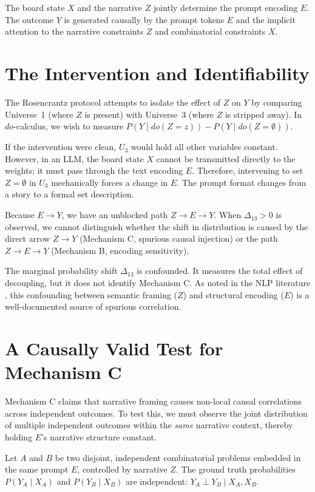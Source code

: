 \documentclass[12pt,a4paper]{article}
\begin{document}
The board state $X$ and the narrative $Z$ jointly determine the prompt encoding $E$. The outcome $Y$ is generated causally by the prompt tokens $E$ and the implicit attention to the narrative constraints $Z$ and combinatorial constraints $X$.

\section{The Intervention and Identifiability}

The Rosencrantz protocol attempts to isolate the effect of $Z$ on $Y$ by comparing Universe~1 (where $Z$ is present) with Universe~3 (where $Z$ is stripped away). In $do$-calculus, we wish to measure $P(Y \mid do(Z=z)) - P(Y \mid do(Z=\emptyset))$.

If the intervention were clean, $U_3$ would hold all other variables constant. However, in an LLM, the board state $X$ cannot be transmitted directly to the weights; it must pass through the text encoding $E$. Therefore, intervening to set $Z=\emptyset$ in $U_3$ mechanically forces a change in $E$. The prompt format changes from a story to a formal set description.

Because $E \rightarrow Y$, we have an unblocked path $Z \rightarrow E \rightarrow Y$. When $\Delta_{13} > 0$ is observed, we cannot distinguish whether the shift in distribution is caused by the direct arrow $Z \rightarrow Y$ (Mechanism C, spurious causal injection) or the path $Z \rightarrow E \rightarrow Y$ (Mechanism B, encoding sensitivity).

The marginal probability shift $\Delta_{13}$ is confounded. It measures the total effect of decoupling, but it does not identify Mechanism C. As noted in the NLP literature \citep{zhou2023explore}, this confounding between semantic framing ($Z$) and structural encoding ($E$) is a well-documented source of spurious correlation.

\section{A Causally Valid Test for Mechanism C}

Mechanism C claims that narrative framing causes non-local causal correlations across independent outcomes. To test this, we must observe the joint distribution of multiple independent outcomes within the \emph{same} narrative context, thereby holding $E$'s narrative structure constant.

Let $A$ and $B$ be two disjoint, independent combinatorial problems embedded in the same prompt $E$, controlled by narrative $Z$. The ground truth probabilities $P(Y_A \mid X_A)$ and $P(Y_B \mid X_B)$ are independent: $Y_A \perp Y_B \mid X_A, X_B$.
\end{document}
